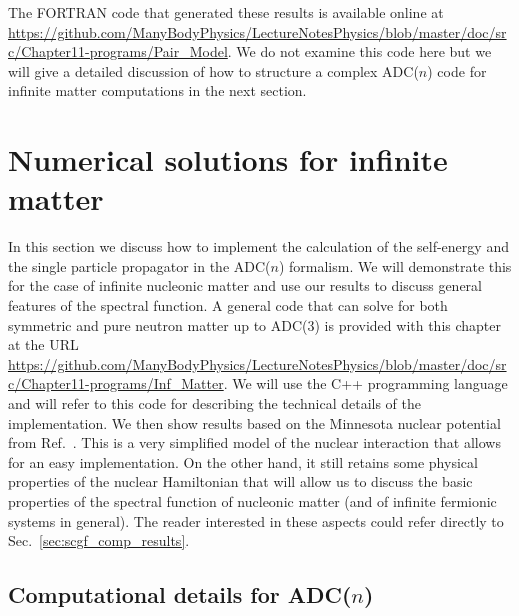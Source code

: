 The FORTRAN code that generated these results is available online at  {\sloppy  \url{https://github.com/ManyBodyPhysics/LectureNotesPhysics/blob/master/doc/src/Chapter11-programs/Pair_Model}}. We do not examine this code here but we will give a detailed discussion of how to structure a complex ADC($n$) code for infinite matter computations in the next section.


\section{Numerical solutions for infinite matter}
\label{sec:scgf_comp}


In this section we discuss how to implement the calculation of the self-energy and the single particle propagator
in the ADC($n$) formalism. We will demonstrate this for the case of infinite nucleonic matter and use our
results to discuss  general  features of the spectral function.
%
A general code that can solve for both symmetric and pure neutron matter up to ADC(3)
is provided with  this chapter at the {\sloppy
URL  \url{https://github.com/ManyBodyPhysics/LectureNotesPhysics/blob/master/doc/src/Chapter11-programs/Inf_Matter}. } 
We will
use the  C++ programming language and will refer to this code for describing the technical details of the implementation.
%
We then show results based on the Minnesota nuclear potential from Ref.~\cite{ch11_minnesota}. This is a very simplified model of the nuclear 
interaction that allows for an easy implementation. On the other hand, it still retains some physical properties of
 the nuclear Hamiltonian that will allow us to discuss the basic properties of the spectral function
of  nucleonic matter (and of infinite fermionic systems in general).  The reader interested in these  aspects could refer directly
to Sec.~\ref{sec:scgf_comp_results}.



\subsection{Computational details for ADC($n$)}
\label{sec:scgf_comp_code}

